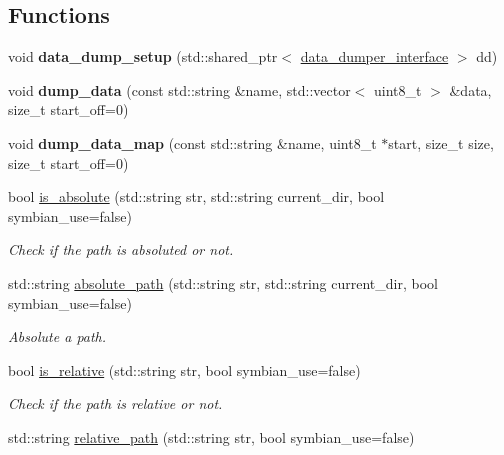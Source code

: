 \subsection*{Functions}
\begin{DoxyCompactItemize}
\item 
\mbox{\label{namespaceeka2l1_a49bb2e7c524b7982df3958148e254afa}} 
void {\bfseries data\+\_\+dump\+\_\+setup} (std\+::shared\+\_\+ptr$<$ \mbox{\hyperlink{structeka2l1_1_1data__dumper__interface}{data\+\_\+dumper\+\_\+interface}} $>$ dd)
\item 
\mbox{\label{namespaceeka2l1_aa12ea8a6bf57ac338dfbcd80cbc932db}} 
void {\bfseries dump\+\_\+data} (const std\+::string \&name, std\+::vector$<$ uint8\+\_\+t $>$ \&data, size\+\_\+t start\+\_\+off=0)
\item 
\mbox{\label{namespaceeka2l1_a2956e87e63222d1d52501ac9633ddd60}} 
void {\bfseries dump\+\_\+data\+\_\+map} (const std\+::string \&name, uint8\+\_\+t $\ast$start, size\+\_\+t size, size\+\_\+t start\+\_\+off=0)
\item 
bool \mbox{\hyperlink{namespaceeka2l1_a7d49f9297703c51fbaab62eaa49a5d6d}{is\+\_\+absolute}} (std\+::string str, std\+::string current\+\_\+dir, bool symbian\+\_\+use=false)
\begin{DoxyCompactList}\small\item\em Check if the path is absoluted or not. \end{DoxyCompactList}\item 
std\+::string \mbox{\hyperlink{namespaceeka2l1_a5b443b59e52b5bc1e3038a2b77db90d3}{absolute\+\_\+path}} (std\+::string str, std\+::string current\+\_\+dir, bool symbian\+\_\+use=false)
\begin{DoxyCompactList}\small\item\em Absolute a path. \end{DoxyCompactList}\item 
bool \mbox{\hyperlink{namespaceeka2l1_adfe165adc08702031d44576b65afd569}{is\+\_\+relative}} (std\+::string str, bool symbian\+\_\+use=false)
\begin{DoxyCompactList}\small\item\em Check if the path is relative or not. \end{DoxyCompactList}\item 
std\+::string \mbox{\hyperlink{namespaceeka2l1_a939be2d2d8d0a2ed1a51c25ca499084a}{relative\+\_\+path}} (std\+::string str, bool symbian\+\_\+use=false)

\end{DoxyCompactItemize}
